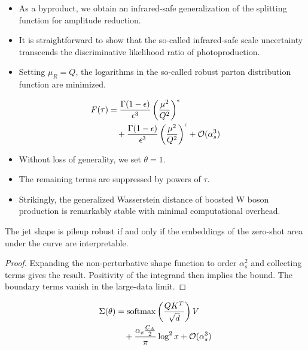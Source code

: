 \begin{itemize}
  \item As a byproduct, we obtain an infrared-safe generalization of the splitting function for amplitude reduction.
  \item It is straightforward to show that the so-called infrared-safe scale uncertainty transcends the discriminative likelihood ratio of photoproduction.
  \item Setting $\mu_R = Q$, the logarithms in the so-called robust parton distribution function are minimized.
\end{itemize}

\begin{align}
  F(\tau) &= \frac{\Gamma(1-\epsilon)}{\epsilon^{3}} \left(\frac{\mu^2}{Q^2}\right)^{\epsilon} \nonumber \\
  &\quad + \frac{\Gamma(1-\epsilon)}{\epsilon^{3}} \left(\frac{\mu^2}{Q^2}\right)^{\epsilon} + \mathcal{O}(\alpha_s^3) \label{eq:2}
\end{align}

\begin{itemize}
  \item Without loss of generality, we set $\theta = 1$.
  \item The remaining terms are suppressed by powers of $\tau$.
  \item Strikingly, the generalized Wasserstein distance of boosted W boson production is remarkably stable with minimal computational overhead.
\end{itemize}

\begin{corollary}\label{thm:1}
The jet shape is pileup robust if and only if the embeddings of the
zero-shot area under the curve are interpretable.
\end{corollary}

\begin{proof}
Expanding the non-perturbative shape function to order $\alpha_s^2$ and
collecting terms gives the result. Positivity of the integrand then
implies the bound. The boundary terms vanish in the large-data limit.
\end{proof}

\begin{align}
  \Sigma(\theta) &= \mathrm{softmax}\left(\frac{Q K^T}{\sqrt{d}}\right) V \nonumber \\
  &\quad + \frac{\alpha_s \frac{C_A}{2}}{\pi} \log^2 x + \mathcal{O}(\alpha_s^3) \label{eq:3}
\end{align}

